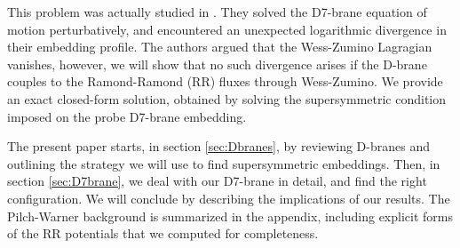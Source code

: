 This problem was actually studied in \cite{Albash:2011nw}. They solved the D7-brane equation of motion perturbatively, and encountered an unexpected logarithmic divergence in their embedding profile. The authors argued that the Wess-Zumino Lagragian vanishes, however, we will show that no such divergence arises if the D-brane couples to the Ramond-Ramond (RR) fluxes through Wess-Zumino. We provide an exact closed-form solution, obtained by solving the supersymmetric condition imposed on the probe D7-brane embedding.

The present paper starts, in section \ref{sec:Dbranes}, by reviewing D-branes and outlining the strategy we will use to find supersymmetric embeddings. Then, in section \ref{sec:D7brane}, we deal with our D7-brane in detail, and find the right configuration. We will conclude by describing the implications of our results. The Pilch-Warner background is summarized in the appendix, including explicit forms of the RR potentials that we computed for completeness. 

